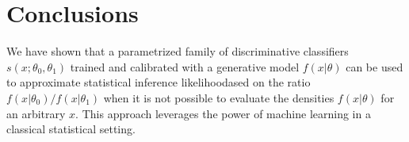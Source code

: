 \documentclass[11pt, oneside]{article}   	%
\begin{document}
\cite{JMLR:v14:tong13a}


\section{Conclusions}

We have shown that a parametrized family of discriminative classifiers $s(x; \theta_0, \theta_1)$ trained and calibrated with a generative model $f(x|\theta)$ can be used to approximate statistical inference likelihoodased on the  ratio $f(x|\theta_0)/f(x|\theta_1)$ when it is not possible to evaluate the densities $f(x|\theta)$ for an arbitrary $x$. This approach leverages the power of machine learning in a classical statistical setting.

%
\end{document}
